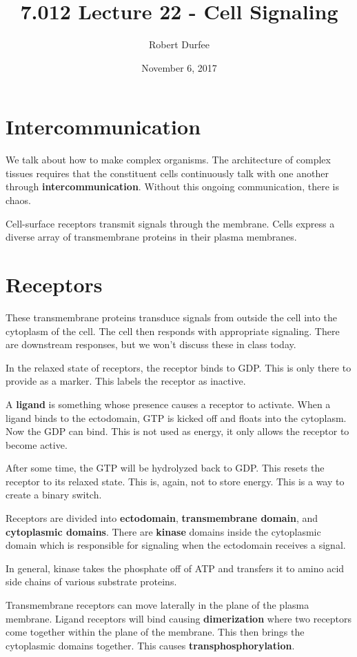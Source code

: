 \documentclass{article}
\title{7.012 Lecture 22 - Cell Signaling}
\author{Robert Durfee}
\date{November 6, 2017}
\begin{document}
\maketitle

\section{Intercommunication}

We talk about how to make complex organisms. The architecture of complex tissues
requires that the constituent cells continuously talk with one another through
\textbf{intercommunication}. Without this ongoing communication, there is chaos. 

Cell-surface receptors transmit signals through the membrane. Cells express a
diverse array of transmembrane proteins in their plasma membranes.

\section{Receptors}

These transmembrane proteins transduce signals from outside the cell into the
cytoplasm of the cell. The cell then responds with appropriate signaling. There
are downstream responses, but we won't discuss these in class today.

In the relaxed state of receptors, the receptor binds to GDP. This is only there
to provide as a marker. This labels the receptor as inactive.

A \textbf{ligand} is something whose presence causes a receptor to activate.
When a ligand binds to the ectodomain, GTP is kicked off and floats into the
cytoplasm. Now the GDP can bind. This is not used as energy, it only allows the
receptor to become active.

After some time, the GTP will be hydrolyzed back to GDP. This resets the
receptor to its relaxed state. This is, again, not to store energy. This is a
way to create a binary switch.

Receptors are divided into \textbf{ectodomain}, \textbf{transmembrane domain},
and \textbf{cytoplasmic domains}. There are \textbf{kinase} domains inside the
cytoplasmic domain which is responsible for signaling when the ectodomain
receives a signal.

In general, kinase takes the phosphate off of ATP and transfers it to amino acid
side chains of various substrate proteins.

Transmembrane receptors can move laterally in the plane of the plasma membrane.
Ligand receptors will bind causing \textbf{dimerization} where two receptors
come together within the plane of the membrane. This then brings the cytoplasmic
domains together. This causes \textbf{transphosphorylation}. 
\end{document}
